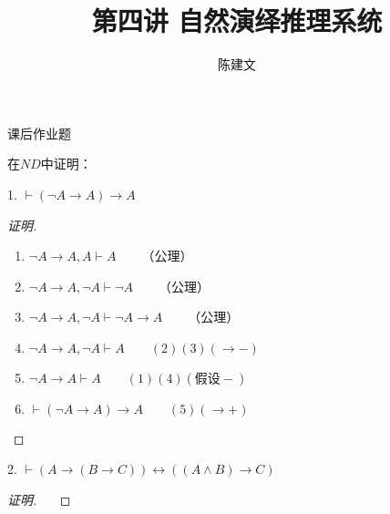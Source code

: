\documentclass{article}
\begin{document}
\begin{CJK*}{UTF8}{gbsn}
  \title{第四讲 自然演绎推理系统}
  \author{陈建文}
  \maketitle

  课后作业题

  在$ND$中证明：

  
    1. $\vdash (\lnot A\to A)\to A$

    \begin{proof}[证明]
      
      $\quad$

      \begin{enumerate}
        \item $\lnot A\to A,A\vdash A\qquad$（公理）
        \item $\lnot A\to A,\lnot A\vdash \lnot A\qquad$（公理）
        \item $\lnot A\to A,\lnot A\vdash \lnot A\to A\qquad$（公理）
        \item $\lnot A\to A,\lnot A\vdash A\qquad(2)(3)(\to -)$
        \item $\lnot A\to A\vdash A\qquad(1)(4)(\text{假设} -)$
        \item $\vdash (\lnot A\to A)\to A\qquad(5)(\to +)$
      \end{enumerate}

    \end{proof}
    
    2. $\vdash (A\to (B\to C))\leftrightarrow ((A\land B)\to C)$

    \begin{proof}[证明]
      
      $\quad$


\end{proof}
\end{CJK*}
\end{document}
